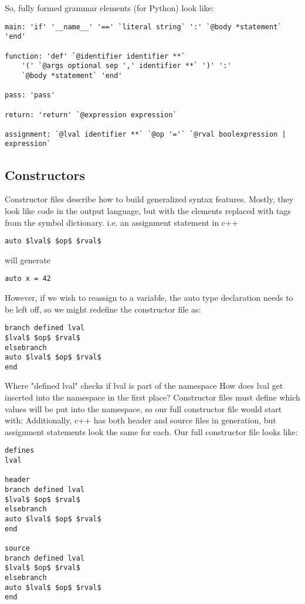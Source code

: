 \documentclass{article}
\begin{document}
So, fully formed grammar elements (for Python) look like:
\begin{verbatim}
main: 'if' '__name__' '==' `literal string` ':' `@body *statement` 'end'

function: 'def' `@identifier identifier **` 
    '(' `@args optional sep ',' identifier **` ')' ':' 
    `@body *statement` 'end' 

pass: 'pass'

return: 'return' `@expression expression`

assignment: `@lval identifier **` `@op '='` `@rval boolexpression | expression`
\end{verbatim}

\subsection{Constructors}

Constructor files describe how to build generalized syntax features. Mostly, they look like code in the output language, but with the elements replaced with tags from the symbol dictionary.
i.e. an assignment statement in c++
\lstset{language=c++}
\begin{lstlisting}
auto $lval$ $op$ $rval$
\end{lstlisting}
will generate
\lstset{language=c++}
\begin{lstlisting}
auto x = 42
\end{lstlisting}
However, if we wish to reassign to a variable, the auto type declaration needs to be left off, so we might redefine the constructor file as:
\begin{verbatim}
branch defined lval 
$lval$ $op$ $rval$
elsebranch
auto $lval$ $op$ $rval$
end
\end{verbatim}
Where "defined lval" checks if lval is part of the namespace
How does lval get inserted into the namespace in the first place?
Constructor files must define which values will be put into the namespace, so our full constructor file would start with:
Additionally, c++ has both header and source files in generation, but assignment statements look the same for each.
Our full constructor file looks like:

\begin{verbatim}
defines
lval

header
branch defined lval 
$lval$ $op$ $rval$
elsebranch
auto $lval$ $op$ $rval$
end

source
branch defined lval 
$lval$ $op$ $rval$
elsebranch
auto $lval$ $op$ $rval$
end
\end{verbatim}
\end{document}

